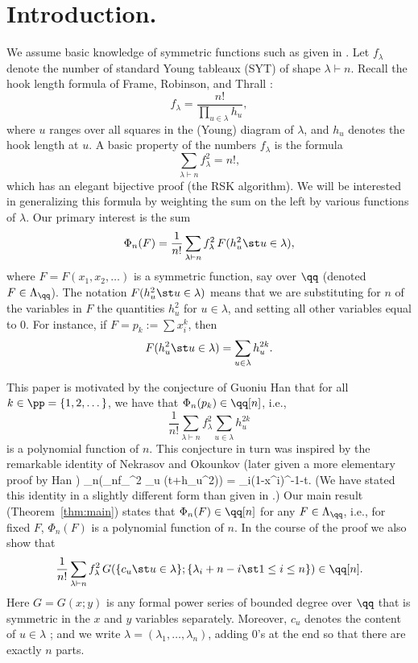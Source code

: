 \documentclass[12pt]{article}
\theoremstyle{definition}
\theoremstyle{remark}
\begin{document}
\section{Introduction.} \label{sec1} We assume basic knowledge of
symmetric functions such as given in \cite[Ch.~7]{ec2}. Let
$f_\lambda$ denote the number of standard Young tableaux (SYT) of
shape $\lambda\vdash n$. Recall the hook length formula of Frame,
Robinson, and Thrall \cite{f-r-t}\cite[Cor.~7.21.6]{ec2}:
  $$ f_\lambda = \frac{n!}{\prod_{u\in\lambda} h_u}, $$
where $u$ ranges over all squares in the (Young) diagram of $\lambda$,
and $h_u$ denotes the hook length at $u$. A basic property of the
numbers $f_\lambda$ is the formula
  $$ \sum_{\lambda\vdash n} f_\lambda^2 = n!, $$
which has an elegant bijective proof (the RSK algorithm). We will be
interested in generalizing this formula by weighting the sum on the
left by various functions of $\lambda$. Our primary interest is the sum
  $$ \Phi_n(F) = \frac{1}{n!}\sum_{\lambda\vdash n} f_\lambda^2\,
            F(h_u^2\st u\in\lambda), $$
where $F=F(x_1,x_2,\dots)$ is a symmetric function, say over $\qq$
(denoted $F\in \Lambda_\qq$).  The notation $F(h_u^2\st u\in\lambda)$
means that we are substituting for $n$ of the variables in $F$ the
quantities $h_u^2$ for $u\in\lambda$, and setting all other variables
equal to 0. For instance, if $F=p_k:= \sum x_i^k$, then
  $$ F(h_u^2\st u\in\lambda) = \sum_{u\in\lambda} h_u^{2k}. $$

This paper is motivated by the conjecture \cite[Conj.~3.1]{han} of
Guoniu Han that for all $k\in\pp=\{1,2,\dots\}$, we have that
$\Phi_n(p_k)\in\qq[n]$, i.e.,  
  $$ \frac{1}{n!}\sum_{\lambda\vdash n} f_\lambda^2\sum_{u\in
       \lambda} h_u^{2k} $$
is a polynomial function of $n$. This conjecture in turn was inspired
by the remarkable identity of Nekrasov and Okounkov \cite{n-o} (later
given a more elementary proof by Han \cite{han2})
  \beq \sum_{n}\left(\sum_{\lambda\vdash n}f_\lambda^2 
   \prod_{u\in\lambda} (t+h_u^2)\right) =
   \prod_{i}(1-x^i)^{-1-t}. \label{eq:n-o} \eeq
(We have stated this identity in a slightly different form than given
in \cite{han2}\cite{n-o}.) Our main result
(Theorem~\ref{thm:main}) states that $\Phi_n(F)\in\qq[n]$ for any
$F\in\Lambda_{\qq}$, i.e., for fixed $F$, $\Phi_n(F)$ is a polynomial
function of $n$. In the course of the proof we also show that 
  $$ \frac{1}{n!}\sum_{\lambda\vdash n}
    f_\lambda^2\,G(\{c_u\st u\in\lambda\}; \{ \lambda_i+n-i\st 1\leq
    i\leq n\})\in \qq[n]. $$
Here $G=G(x;y)$ is any formal power series of bounded degree over
$\qq$ that is symmetric in the $x$ and $y$ variables separately.
Moreover, $c_u$ denotes the content of $u\in\lambda$
\cite[p.~373]{ec2}; and we write
$\lambda=(\lambda_1,\dots,\lambda_n)$, adding 0's at the end so that
there are exactly $n$ parts.
\end{document}
